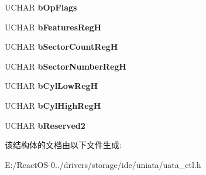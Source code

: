 \begin{DoxyCompactItemize}
\begin{tabbing}
\end{tabbing}\item 
\mbox{\label{struct___i_d_e_r_e_g_s___e_x_a4894ea00db11a01a8799d1d04301c65f}} 
U\+C\+H\+AR {\bfseries b\+Op\+Flags}
\item 
\mbox{\label{struct___i_d_e_r_e_g_s___e_x_aa9eb79fdaeff16a4f5888be274467311}} 
U\+C\+H\+AR {\bfseries b\+Features\+RegH}
\item 
\mbox{\label{struct___i_d_e_r_e_g_s___e_x_adcfd04a6d01c22a36d4fdfb8bd6e5558}} 
U\+C\+H\+AR {\bfseries b\+Sector\+Count\+RegH}
\item 
\mbox{\label{struct___i_d_e_r_e_g_s___e_x_a914c4f62370920e35eea127e17ade087}} 
U\+C\+H\+AR {\bfseries b\+Sector\+Number\+RegH}
\item 
\mbox{\label{struct___i_d_e_r_e_g_s___e_x_a81679dffaacbc098ef4511c3a4e8887d}} 
U\+C\+H\+AR {\bfseries b\+Cyl\+Low\+RegH}
\item 
\mbox{\label{struct___i_d_e_r_e_g_s___e_x_adb02d159cc9446b5781a2a0310449572}} 
U\+C\+H\+AR {\bfseries b\+Cyl\+High\+RegH}
\item 
\mbox{\label{struct___i_d_e_r_e_g_s___e_x_a12b47f615904fec95a92f32469cadddc}} 
U\+C\+H\+AR {\bfseries b\+Reserved2}
\end{DoxyCompactItemize}


该结构体的文档由以下文件生成\+:\begin{DoxyCompactItemize}
\item 
E\+:/\+React\+O\+S-\/0../drivers/storage/ide/uniata/uata\+\_\+ctl.\+h\end{DoxyCompactItemize}
